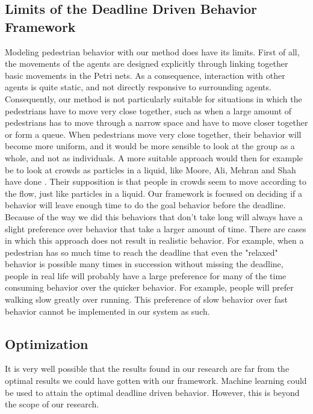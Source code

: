 \documentclass[11pt]{book}
\begin{document}
\subsection{Limits of the Deadline Driven Behavior Framework}
Modeling pedestrian behavior with our method does have its limits. First of all, the movements of the agents are designed explicitly through linking together basic movements in the Petri nets. As a consequence, interaction with other agents is quite static, and not directly responsive to surrounding agents. Consequently, our method is not particularly suitable for situations in which the pedestrians have to move very close together, such as when a large amount of pedestrians has to move through a narrow space and have to move closer together or form a queue. When pedestrians move very close together, their behavior will become more uniform, and it would be more sensible to look at the group as a whole, and not as individuals. A more suitable approach would then for example be to look at crowds as particles in a liquid, like Moore, Ali, Mehran and Shah have done \cite{Moore:2011:VCS:2043174.2043192}. Their supposition is that people in crowds seem to move according to the flow, just like particles in a liquid.
Our framework is focused on deciding if a behavior will leave enough time to do the goal behavior before the deadline. Because of the way we did this behaviors that don't take long will always have a slight preference over behavior that take a larger amount of time. There are cases in which this approach does not result in realistic behavior. For example, when a pedestrian has so much time to reach the deadline that even the "relaxed" behavior is possible many times in succession without missing the deadline, people in real life will probably have a large preference for many of the time consuming behavior over the quicker behavior. For example, people will prefer walking slow greatly over running. This preference of slow behavior over fast behavior cannot be implemented in our system as such.

\subsection{Optimization}
It is very well possible that the results found in our research are far from the optimal results we could have gotten with our framework.  Machine learning could be used to attain the optimal deadline driven behavior. However, this is beyond the scope of our research.
\end{document}
